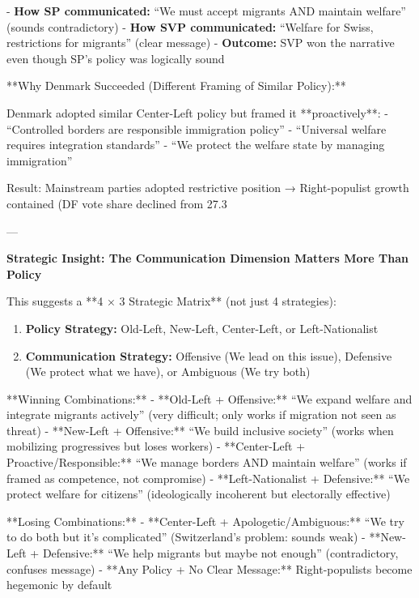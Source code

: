 - \textbf{How SP communicated:} ``We must accept migrants AND maintain welfare'' (sounds contradictory)
- \textbf{How SVP communicated:} ``Welfare for Swiss, restrictions for migrants'' (clear message)
- \textbf{Outcome:} SVP won the narrative even though SP's policy was logically sound

**Why Denmark Succeeded (Different Framing of Similar Policy):**

Denmark adopted similar Center-Left policy but framed it **proactively**:
- ``Controlled borders are responsible immigration policy''
- ``Universal welfare requires integration standards''
- ``We protect the welfare state by managing immigration''

Result: Mainstream parties adopted restrictive position → Right-populist growth contained (DF vote share declined from 27.3%

---

\textbf{Strategic Insight: The Communication Dimension Matters More Than Policy}

This suggests a **4 × 3 Strategic Matrix** (not just 4 strategies):

\begin{enumerate}

\item \textbf{Policy Strategy:} Old-Left, New-Left, Center-Left, or Left-Nationalist
\item \textbf{Communication Strategy:} Offensive (We lead on this issue), Defensive (We protect what we have), or Ambiguous (We try both)

\end{enumerate}

**Winning Combinations:**
- **Old-Left + Offensive:** ``We expand welfare and integrate migrants actively'' (very difficult; only works if migration not seen as threat)
- **New-Left + Offensive:** ``We build inclusive society'' (works when mobilizing progressives but loses workers)
- **Center-Left + Proactive/Responsible:** ``We manage borders AND maintain welfare'' (works if framed as competence, not compromise)
- **Left-Nationalist + Defensive:** ``We protect welfare for citizens'' (ideologically incoherent but electorally effective)

**Losing Combinations:**
- **Center-Left + Apologetic/Ambiguous:** ``We try to do both but it's complicated'' (Switzerland's problem: sounds weak)
- **New-Left + Defensive:** ``We help migrants but maybe not enough'' (contradictory, confuses message)
- **Any Policy + No Clear Message:** Right-populists become hegemonic by default

